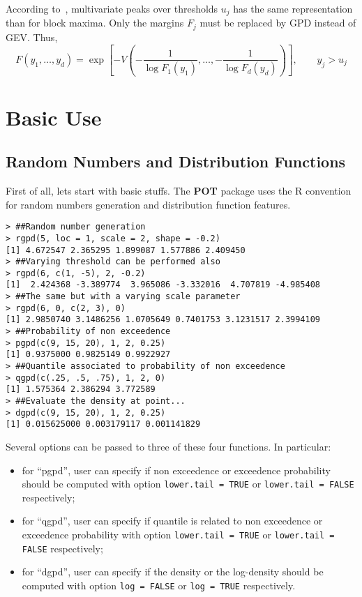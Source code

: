 \documentclass[11pt,a4paper]{article}
\numberwithin{equation}{section}
\theoremstyle{definition}
\begin{document}
According to~\citet[Prop. 5.15]{Resnick1987}, multivariate peaks over
thresholds $u_j$ has the same representation than for block
maxima. Only the margins $F_j$ must be replaced by GPD instead of
GEV\@. Thus,
\begin{equation}
  \label{eq:multExcess}
  F\left(y_1, \ldots, y_d \right) = \exp\left[-V\left( - \frac{1}{\log
      F_1\left(y_1 \right)}, \ldots, - \frac{1}{\log F_d\left(y_d
      \right)} \right) \right], \qquad y_j > u_j
\end{equation}

 
\section{Basic Use}
\label{sec:BasicUse}

\subsection{Random Numbers and Distribution Functions}
\label{subsec:randDist}

First of all, lets start with basic stuffs. The \textbf{POT} package
uses the R convention for random numbers generation and distribution
function features. 
\begin{verbatim}
> ##Random number generation
> rgpd(5, loc = 1, scale = 2, shape = -0.2)
[1] 4.672547 2.365295 1.899087 1.577886 2.409450
> ##Varying threshold can be performed also
> rgpd(6, c(1, -5), 2, -0.2)
[1]  2.424368 -3.389774  3.965086 -3.332016  4.707819 -4.985408
> ##The same but with a varying scale parameter
> rgpd(6, 0, c(2, 3), 0)
[1] 2.9850740 3.1486256 1.0705649 0.7401753 3.1231517 2.3994109
> ##Probability of non exceedence
> pgpd(c(9, 15, 20), 1, 2, 0.25)
[1] 0.9375000 0.9825149 0.9922927
> ##Quantile associated to probability of non exceedence
> qgpd(c(.25, .5, .75), 1, 2, 0)
[1] 1.575364 2.386294 3.772589
> ##Evaluate the density at point...
> dgpd(c(9, 15, 20), 1, 2, 0.25)
[1] 0.015625000 0.003179117 0.001141829
\end{verbatim}
Several options can be passed to three of these four functions. In
particular:
\begin{itemize}
\item for ``pgpd'', user can specify if non exceedence or exceedence
  probability should be computed with option \verb+lower.tail = TRUE+
  or  \verb+lower.tail = FALSE+ respectively;
\item for ``qgpd'', user can specify if quantile is related to non
  exceedence or exceedence probability with option
  \verb+lower.tail = TRUE+ or \verb+lower.tail = FALSE+ respectively;
\item for ``dgpd'', user can specify if the density or the log-density
  should be computed with option \verb+log = FALSE+ or
  \verb+log = TRUE+ respectively.
\end{itemize}
\end{document}
